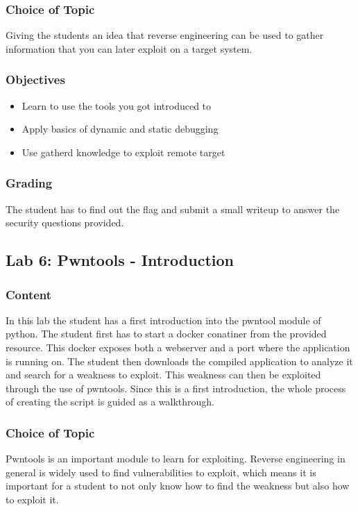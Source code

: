 \subsubsection*{Choice of Topic}
Giving the students an idea that reverse engineering can be used to gather information that you can later exploit on a target system.
\subsubsection*{Objectives}
\begin{itemize}
    \item Learn to use the tools you got introduced to
    \item Apply basics of dynamic and static debugging
    \item Use gatherd knowledge to exploit remote target
\end{itemize}
\subsubsection*{Grading}
The student has to find out the flag and submit a small writeup to answer the security questions provided.


\subsection{Lab 6: Pwntools - Introduction}
\subsubsection*{Content}
In this lab the student has a first introduction into the pwntool module of python. The student first has to start a docker conatiner from the provided resource. This docker exposes both a webserver and a port where the application is running on. The student then downloads the compiled application to analyze it and search for a weakness to exploit. This weakness can then be exploited through the use of pwntools. Since this is a first introduction, the whole process of creating the script is guided as a walkthrough.
\subsubsection*{Choice of Topic}
Pwntools is an important module to learn for exploiting. Reverse engineering in general is widely used to find vulnerabilities to exploit, which means it is important for a student to not only know how to find the weakness but also how to exploit it.
